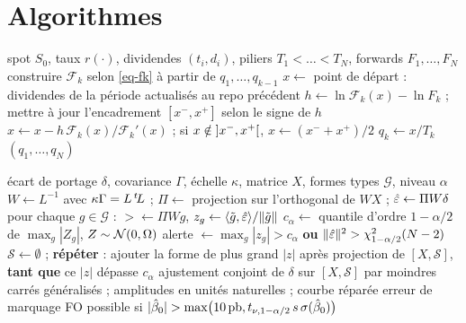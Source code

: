 \section{Algorithmes}\label{app-algos}
\begin{algorithm}[H]
\caption{Bootstrap du repo implicite}\label{alg-bootstrap}
\begin{algorithmic}[1]
\Require spot $S_0$, taux $r(\cdot)$, dividendes $(t_i, d_i)$, piliers $T_1<\dots<T_N$, forwards $F_1, \dots, F_N$
  \State construire $\mathcal F_k$ selon \eqref{eq-fk} à partir de $q_1, \dots, q_{k-1}$
  \State $x\gets$ point de départ : dividendes de la période actualisés au repo précédent
  \Repeat
    \State $h\gets\ln\mathcal F_k(x)-\ln F_k$ ; mettre à jour l'encadrement $[x^-, x^+]$ selon le signe de $h$
    \State $x\gets x-h\,\mathcal F_k(x)/\mathcal F_k'(x)$ ; si $x\notin\mathopen{]}x^-, x^+\mathclose{[}$, $x\gets(x^-+x^+)/2$
  \State $q_k\gets x/T_k$
\EndFor
\State \Return $(q_1, \dots, q_N)$
\end{algorithmic}
\end{algorithm}

\begin{algorithm}[H]
\caption{Détection structurelle}\label{alg-detect}
\begin{algorithmic}[1]
\Require écart de portage $\delta$, covariance $\Gamma$, échelle $\kappa$, matrice $X$, formes types $\mathcal G$, niveau $\alpha$
\State $W\gets L^{-1}$ avec $\kappa\Gamma=L\,{}^{t}\!L$ ; $\Pi\gets$ projection sur l'orthogonal de $WX$ ; $\hat\varepsilon\gets\Pi W\delta$
\State pour chaque $g\in\mathcal G$ : $\gt\gets\Pi Wg$, $z_g\gets\langle \tilde g, \hat\varepsilon\rangle/\lVert \tilde g\rVert$
\State $c_\alpha\gets$ quantile d'ordre $1-\alpha/2$ de $\max_g|Z_g|$, $Z\sim\mathcal{N}(0, \Omega)$ 
\State alerte $\gets\max_g|z_g|>c_\alpha$ \textbf{ou} $\lVert \hat\varepsilon\rVert^2>\chi^2_{1-\alpha/2}(N-2)$
  \State $\mathcal S\gets\emptyset$ ; \textbf{répéter} : ajouter la forme de plus grand $|z|$ après projection de
  $[X, \mathcal S]$,
  \Statex \hspace{\algorithmicindent} \textbf{tant que} ce $|z|$ dépasse $c_\alpha$
\EndIf
\State ajustement conjoint de $\delta$ sur $[X, \mathcal S]$ par moindres carrés généralisés ; amplitudes en unités
naturelles ; courbe réparée
\State erreur de marquage FO possible si $|\hat\beta_0|>\max\bigl(10\text{\,pb}, t_{\nu,1-\alpha/2}\,s\,\sigma(\hat\beta_0)\bigr)$
\end{algorithmic}
\end{algorithm}

